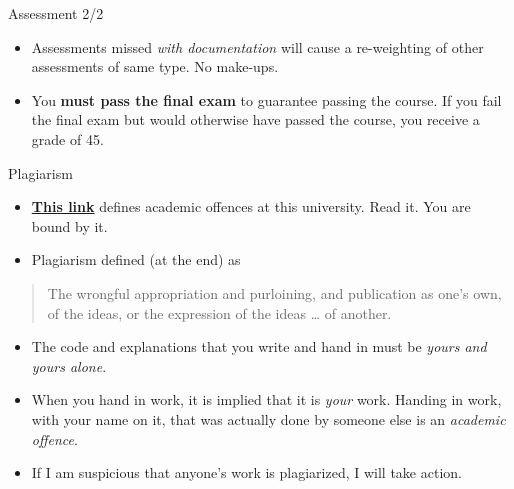 \documentclass[ignorenonframetext,]{beamer}
\begin{document}
\begin{frame}{Assessment 2/2}
\protect\hypertarget{assessment-22}{}

\begin{itemize}
\item
  Assessments missed \emph{with documentation} will cause a re-weighting
  of other assessments of same type. No make-ups.
\item
  You \textbf{must pass the final exam} to guarantee passing the course.
  If you fail the final exam but would otherwise have passed the course,
  you receive a grade of 45.
\end{itemize}

\end{frame}

\begin{frame}{Plagiarism}
\protect\hypertarget{plagiarism}{}

\begin{itemize}
\item
  \href{http://www.utoronto.ca/academicintegrity/academicoffenses.html}{\textbf{This
  link}} defines academic offences at this university. Read it. You are
  bound by it.
\item
  Plagiarism defined (at the end) as
\end{itemize}

\begin{quote}
The wrongful appropriation and purloining, and publication as one's own,
of the ideas, or the expression of the ideas \ldots{} of another.
\end{quote}

\begin{itemize}
\item
  The code and explanations that you write and hand in must be
  \emph{yours and yours alone}.
\item
  When you hand in work, it is implied that it is \emph{your} work.
  Handing in work, with your name on it, that was actually done by
  someone else is an \emph{academic offence}.
\item
  If I am suspicious that anyone's work is plagiarized, I will take
  action.
\end{itemize}

\end{frame}
\end{document}
